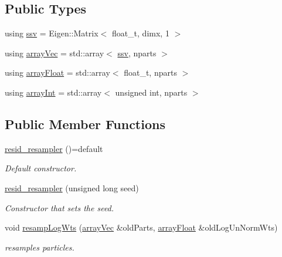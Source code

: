 \subsection*{Public Types}
\begin{DoxyCompactItemize}
\item 
using \hyperlink{classresid__resampler_a500f44f0072a4d54b03762c946c38981}{ssv} = Eigen\+::\+Matrix$<$ float\+\_\+t, dimx, 1 $>$
\item 
using \hyperlink{classresid__resampler_a33ba5996cd3099fb81d9932bf5f460c0}{array\+Vec} = std\+::array$<$ \hyperlink{classrbase_ae20e0b8df15aa109252f57ecbf1f20f8}{ssv}, nparts $>$
\item 
using \hyperlink{classresid__resampler_ab95ecc6d5a33f1cbc9089a6b818df405}{array\+Float} = std\+::array$<$ float\+\_\+t, nparts $>$
\item 
using \hyperlink{classresid__resampler_a2ca1138b2d0fcad22c3720c83e56fc47}{array\+Int} = std\+::array$<$ unsigned int, nparts $>$
\end{DoxyCompactItemize}
\subsection*{Public Member Functions}
\begin{DoxyCompactItemize}
\item 
\mbox{\label{classresid__resampler_a7b3ebcc490d296b4ad9747c369b92f67}} 
\hyperlink{classresid__resampler_a7b3ebcc490d296b4ad9747c369b92f67}{resid\+\_\+resampler} ()=default
\begin{DoxyCompactList}\small\item\em Default constructor. \end{DoxyCompactList}\item 
\hyperlink{classresid__resampler_a7c5a27732c78f6d30919ec4135f99228}{resid\+\_\+resampler} (unsigned long seed)
\begin{DoxyCompactList}\small\item\em Constructor that sets the seed. \end{DoxyCompactList}\item 
void \hyperlink{classresid__resampler_ae6957cd1e080ac4313e6b0bc5ae9aa96}{resamp\+Log\+Wts} (\hyperlink{classrbase_aa12fc826befa6ba0647b5f59ebc396ee}{array\+Vec} \&old\+Parts, \hyperlink{classrbase_a6f76bef853e508cb5b6f546d231b06f5}{array\+Float} \&old\+Log\+Un\+Norm\+Wts)
\begin{DoxyCompactList}\small\item\em resamples particles. \end{DoxyCompactList}\end{DoxyCompactItemize}
